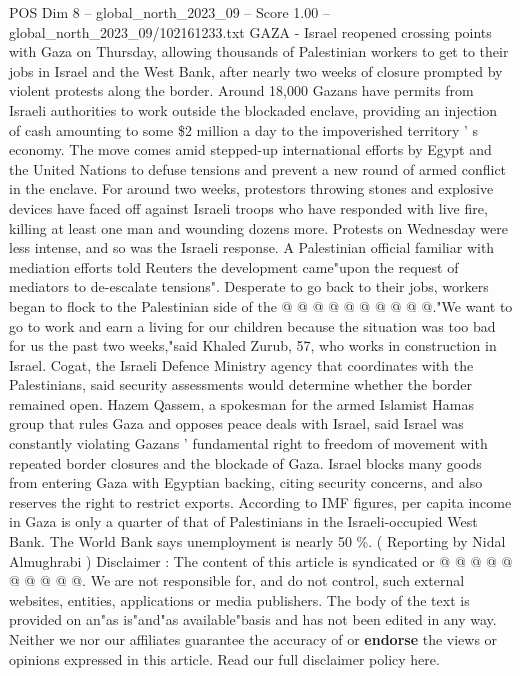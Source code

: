 \begin{textsample}{POS Dim 8 – global\_north\_2023\_09 – Score 1.00 – global\_north\_2023\_09/102161233.txt}  \label{ex:f8_pos_305}
GAZA - Israel reopened crossing points with Gaza on Thursday, allowing thousands of Palestinian workers to get to their jobs in Israel and the West Bank, after nearly two weeks of closure prompted by violent protests along the border.
Around 18,000 Gazans have permits from Israeli authorities to work outside the blockaded enclave, providing an injection of cash amounting to some \$2 million a day to the impoverished territory ' s economy.
The move comes amid stepped-up international efforts by Egypt and the United Nations to defuse tensions and prevent a new round of armed conflict in the enclave.
For around two weeks, protestors throwing stones and explosive devices have faced off against Israeli troops who have responded with live fire, killing at least one man and wounding dozens more.
Protests on Wednesday were less intense, and so was the Israeli response.
A Palestinian official familiar with mediation efforts told Reuters the development came"upon the request of mediators to de-escalate tensions".
Desperate to go back to their jobs, workers began to flock to the Palestinian side of the @ @ @ @ @ @ @ @ @ @."We want to go to work and earn a living for our children because the situation was too bad for us the past two weeks,"said Khaled Zurub, 57, who works in construction in Israel.
Cogat, the Israeli Defence Ministry agency that coordinates with the Palestinians, said security assessments would determine whether the border remained open.
Hazem Qassem, a spokesman for the armed Islamist Hamas group that rules Gaza and opposes peace deals with Israel, said Israel was constantly violating Gazans ' fundamental right to freedom of movement with repeated border closures and the blockade of Gaza.
Israel blocks many goods from entering Gaza with Egyptian backing, citing security concerns, and also reserves the right to restrict exports.
According to IMF figures, per capita income in Gaza is only a quarter of that of Palestinians in the Israeli-occupied West Bank.
The World Bank says unemployment is nearly 50 \%. ( Reporting by Nidal Almughrabi ) Disclaimer : The content of this article is syndicated or @ @ @ @ @ @ @ @ @ @.
We are not responsible for, and do not control, such external websites, entities, applications or media publishers.
The body of the text is provided on an"as is"and"as available"basis and has not been edited in any way.
Neither we nor our affiliates guarantee the accuracy of or \textbf{endorse} the views or opinions expressed in this article.
Read our full disclaimer policy here.

\end{textsample}
